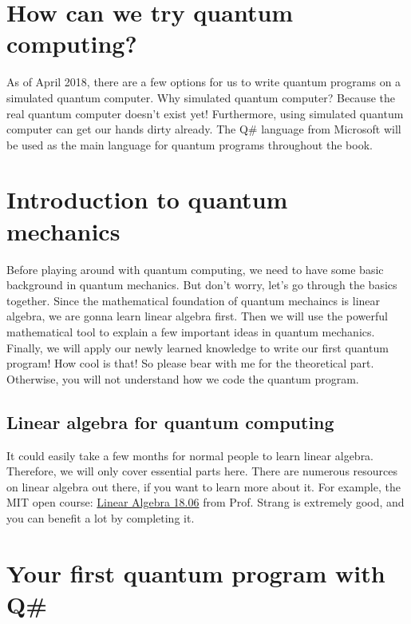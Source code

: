 \section{\textbf{How} can we try quantum computing?}

\begin{fullwidth}

As of April 2018, there are a few options for us to write quantum programs on a simulated quantum computer.
Why simulated quantum computer? Because the real quantum computer doesn't exist yet!
Furthermore, using simulated quantum computer can get our hands dirty already.
The Q\# language from Microsoft will be used as the main language for quantum programs throughout the book.

\end{fullwidth}

\section{Introduction to quantum mechanics}

Before playing around with quantum computing, we need to have some basic background in quantum mechanics.
But don't worry, let's go through the basics together.
Since the mathematical foundation of quantum mechaincs is linear algebra, we are gonna learn linear algebra first.
Then we will use the powerful mathematical tool to explain a few important ideas in quantum mechanics.
Finally, we will apply our newly learned knowledge to write our first quantum program!
How cool is that!
So please bear with me for the theoretical part.
Otherwise, you will not understand how we code the quantum program.

\subsection{Linear algebra for quantum computing}
It could easily take a few months for normal people to learn linear algebra.
Therefore, we will only cover essential parts here.
There are numerous resources on linear algebra out there, if you want to learn more about it.
For example, the MIT open course: \href{https://ocw.mit.edu/courses/mathematics/18-06-linear-algebra-spring-2010/}{Linear Algebra 18.06} from Prof. Strang\cite{Chapter1-mit-linear-algebra} is extremely good, and you can benefit a lot by completing it.

\section{Your first quantum program with Q\#}

